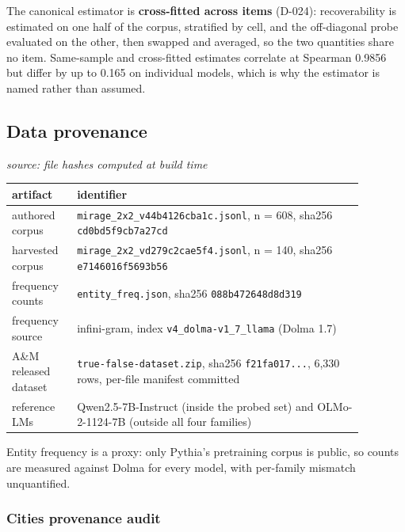 \documentclass[10pt]{article}
\begin{document}
The canonical estimator is \textbf{cross-fitted across items} (D-024): recoverability is estimated on one half of the corpus, stratified by cell, and the off-diagonal probe evaluated on the other, then swapped and averaged, so the two quantities share no item. Same-sample and cross-fitted estimates correlate at Spearman 0.9856 but differ by up to 0.165 on individual models, which is why the estimator is named rather than assumed.

\subsection{Data provenance}

{\footnotesize\raggedright\sloppy \emph{source: file hashes computed at build time}\par}

\begin{table}[H]
\centering
\small
\begin{tabular}{>{\raggedright\arraybackslash}p{0.160\linewidth} >{\raggedright\arraybackslash}p{0.720\linewidth}}
\toprule
\textbf{artifact} & \textbf{identifier} \\
\midrule
authored corpus & \texttt{mirage\_2x2\_v44b4126cba1c.jsonl}, n = 608, sha256 \texttt{cd0bd5f9cb7a27cd} \\
harvested corpus & \texttt{mirage\_2x2\_vd279c2cae5f4.jsonl}, n = 140, sha256 \texttt{e7146016f5693b56} \\
frequency counts & \texttt{entity\_freq.json}, sha256 \texttt{088b472648d8d319} \\
frequency source & infini-gram, index \texttt{v4\_dolma-v1\_7\_llama} (Dolma 1.7) \\
A\&M released dataset & \texttt{true-false-dataset.zip}, sha256 \texttt{f21fa017...}, 6,330 rows, per-file manifest committed \\
reference LMs & Qwen2.5-7B-Instruct (inside the probed set) and OLMo-2-1124-7B (outside all four families) \\
\bottomrule
\end{tabular}
\end{table}

Entity frequency is a proxy: only Pythia's pretraining corpus is public, so counts are measured against Dolma for every model, with per-family mismatch unquantified.

\subsubsection{Cities provenance audit}
\end{document}
